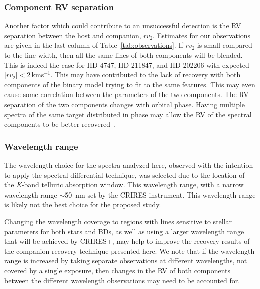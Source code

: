 \documentclass[fleqn,usenatbib]{mnras}
\newcommand{\kmps}{\,kms\(^{-1}\)}	%
\begin{document}
\subsubsection{Component RV separation}
\label{subsubsec:rv_seperation}
Another factor which could contribute to an unsuccessful detection is the RV separation between the host and companion, \(rv_2\). Estimates for our observations are given in the last column of Table~\ref{tab:observations}. If \({rv}_2\) is small compared to the line width, then all the same lines of both components will be blended. This is indeed the case for {HD 4747}, {HD 211847}, and {HD 202206} with expected \(|{rv}_2| < 2\)\kmps{}. This may have contributed to the lack of recovery with both components of the binary model trying to fit to the same features. This may even cause some correlation between the parameters of the two components. The RV separation of the two components changes with orbital phase. Having multiple spectra of the same target distributed in phase may allow the RV of the spectral components to be better recovered~\citep[e.g.][]{czekala_disentangling_2017, sablowski_spectral_2016}. 


\subsubsection {Wavelength range}
\label{subsubsec:wavelenght_range_limitation}
The wavelength choice for the spectra analyzed here, observed with the intention to apply the spectral differential technique, was selected due to the location of the \textit{K}-band telluric absorption window. This wavelength range, with a narrow wavelength range \(\sim50\)~nm set by the CRIRES instrument. This wavelength range is likely not the best choice for the proposed study. 

Changing the wavelength coverage to regions with lines sensitive to stellar parameters for both stars and BDs, as well as using a larger wavelength range that will be achieved by CRIRES+, may help to improve the recovery results of the companion recovery technique presented here. We note that if the wavelength range is increased by taking separate observations at different wavelengths, not covered by a single exposure, then changes in the RV of both components between the different wavelength observations may need to be accounted for. 
\end{document}
